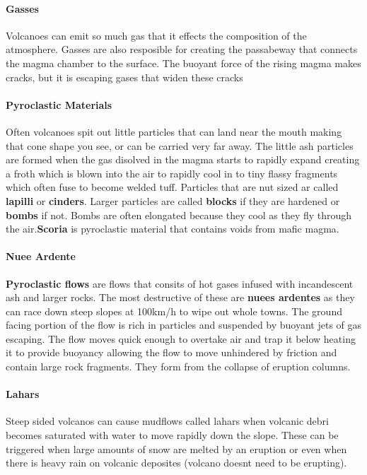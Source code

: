 \documentclass{article}
\begin{document}
\paragraph{Gasses} %
\label{par:gasses}
Volcanoes can emit so much gas that it effects the composition of the atmosphere. Gasses are also resposible for creating the passabeway that connects the magma chamber to the surface. The buoyant force of the rising magma makes cracks, but it is escaping gases that widen these cracks

\paragraph{Pyroclastic Materials} %
\label{par:pyroclastic_materials}
Often volcanoes spit out little particles that can land near the mouth making that cone shape you see, or can be carried very far away. The little ash particles are formed when the gas disolved in the magma starts to rapidly expand creating a froth which is blown into the air to rapidly cool in to tiny flassy fragments which often fuse to become welded tuff. Particles that are nut sized ar called \textbf{lapilli} or \textbf{cinders}. Larger particles are called \textbf{blocks} if they are hardened or \textbf{bombs} if not. Bombs are often elongated because they cool as they fly through the air.\textbf{Scoria} is pyroclastic material that contains voids from mafic magma.

 \paragraph{Nuee Ardente} %
 \label{par:nuee_ardente}
 \textbf{Pyroclastic flows} are flows that consits of hot gases infused with incandescent ash and larger rocks. The most destructive of these are \textbf{nuees ardentes} as they can race down steep slopes at 100km/h to wipe out whole towns. The ground facing portion of the flow is rich in particles and suspended by buoyant jets of gas escaping. The flow moves quick enough to overtake air and trap it below heating it to provide buoyancy allowing the flow to move unhindered by friction and contain large rock fragments. They form from the collapse of eruption columns.

 \paragraph{Lahars} %
 \label{par:lahars}
 Steep sided volcanos can cause mudflows called lahars when volcanic debri becomes saturated with water to move rapidly down the slope. These can be triggered when large amounts of snow are melted by an eruption or even when there is heavy rain on volcanic deposites (volcano doesnt need to be erupting).
\end{document}
